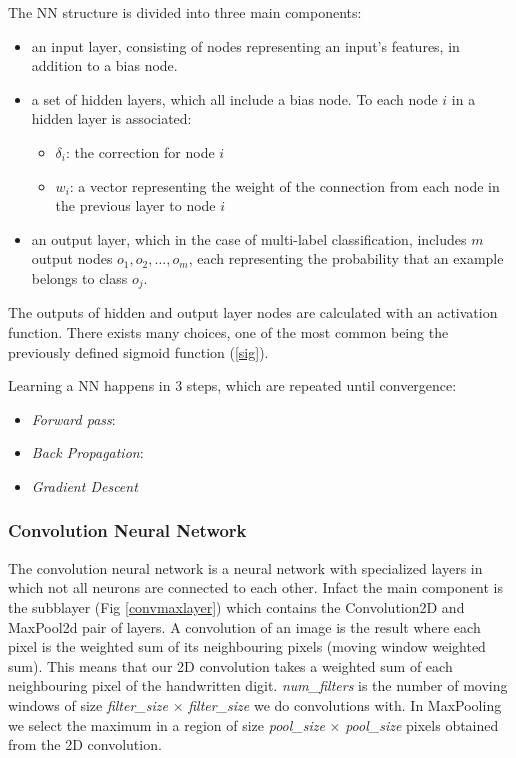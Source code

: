 \documentclass[conference]{IEEEtran}
\begin{document}
The NN structure is divided into three main components: 
\begin{itemize}
\item an input layer, consisting of nodes representing an input's features, in addition to a bias node.
\item a set of hidden layers, which all include a bias node. To each node $i$ in a hidden layer is associated:
\begin{itemize}
\item $\delta_i$: the correction for node $i$
\item $w_i$: a vector representing the weight of the connection from each node in the previous layer to node $i$
\end{itemize}
\item an output layer, which in the case of multi-label classification, includes $m$ output nodes $o_1,o_2,\dots,o_m$, each representing the probability that an example belongs to class $o_j$.
\end{itemize}

The outputs of hidden and output layer nodes are calculated with an activation function. There exists many choices, one of the most common being the previously defined sigmoid function (\ref{sig}).



Learning a NN happens in 3 steps, which are repeated until convergence:
\begin{itemize}
\item \emph{Forward pass}:
\item \emph{Back Propagation}:
\item \emph{Gradient Descent}
\end{itemize}

\subsubsection{Convolution Neural Network}
The convolution neural network \cite{LeCunn98} is a neural network with specialized layers in which not all neurons are connected to each other. Infact the main component is the subblayer (Fig \ref{convmaxlayer}) which contains the Convolution2D and MaxPool2d pair of layers. A convolution of an image is the result where each pixel is the weighted sum of its neighbouring pixels (moving window weighted sum). This means that our 2D convolution takes a weighted sum of each neighbouring pixel of the handwritten digit. \emph{num\_filters} is the number of moving windows of size \emph{filter\_size} $\times$ \emph{filter\_size} we do convolutions with. In MaxPooling we select the maximum in a region of size \emph{pool\_size} $\times$ \emph{pool\_size} pixels obtained from the 2D convolution.
\end{document}
